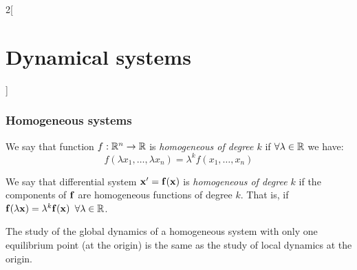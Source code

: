 \documentclass[../../../main_math.tex]{subfiles}
\begin{document}
\begin{multicols}{2}[\section{Dynamical systems}]
  \subsubsection{Homogeneous systems}
  \begin{definition}
    We say that function $f:\mathbb{R}^n\rightarrow\mathbb{R}$ is \emph{homogeneous of degree $k$} if $\forall\lambda\in\mathbb{R}$ we have:
    $$f(\lambda x_1,\ldots,\lambda x_n)=\lambda^k f(x_1,\ldots,x_n)$$
  \end{definition}
  \begin{definition}
    We say that differential system $\boldsymbol{\mathrm{x}}'=\boldsymbol{\mathrm{f}}(\boldsymbol{\mathrm{x}})$ is \emph{homogeneous of degree $k$} if the components of $\boldsymbol{\mathrm{f}}$ are homogeneous functions of degree $k$. That is, if $\boldsymbol{\mathrm{f}}(\lambda \boldsymbol{\mathrm{x}})=\lambda^k\boldsymbol{\mathrm{f}}(\boldsymbol{\mathrm{x}})$ $\forall \lambda\in \mathbb{R}$.
  \end{definition}
  \begin{proposition}
    The study of the global dynamics of a homogeneous system with only one equilibrium point (at the origin) is the same as the study of local dynamics at the origin.
  \end{proposition}

\end{multicols}
\end{document}
